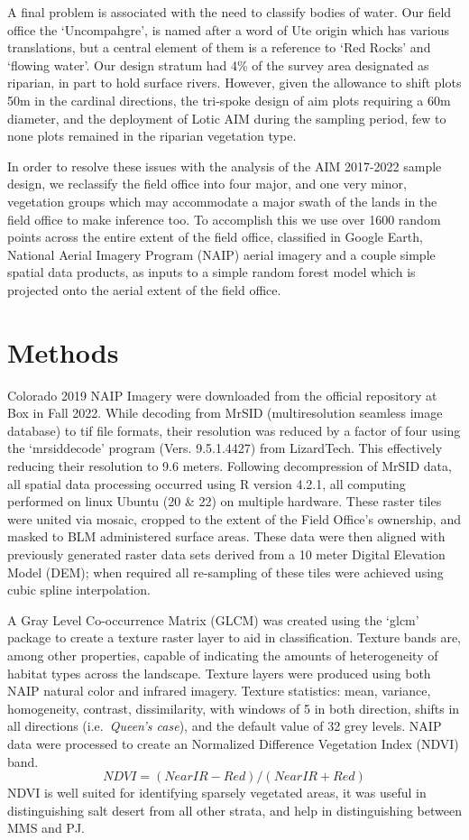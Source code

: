 \documentclass[
]{article}
\begin{document}
A final problem is associated with the need to classify bodies of water.
Our field office the `Uncompahgre', is named after a word of Ute origin
which has various translations, but a central element of them is a
reference to `Red Rocks' and `flowing water'. Our design stratum had 4\%
of the survey area designated as riparian, in part to hold surface
rivers. However, given the allowance to shift plots 50m in the cardinal
directions, the tri-spoke design of aim plots requiring a 60m diameter,
and the deployment of Lotic AIM during the sampling period, few to none
plots remained in the riparian vegetation type.

In order to resolve these issues with the analysis of the AIM 2017-2022
sample design, we reclassify the field office into four major, and one
very minor, vegetation groups which may accommodate a major swath of the
lands in the field office to make inference too. To accomplish this we
use over 1600 random points across the entire extent of the field
office, classified in Google Earth, National Aerial Imagery Program
(NAIP) aerial imagery and a couple simple spatial data products, as
inputs to a simple random forest model which is projected onto the
aerial extent of the field office.

\hypertarget{methods}{%
\section{Methods}\label{methods}}

Colorado 2019 NAIP Imagery were downloaded from the official repository
at Box in Fall 2022. While decoding from MrSID (multiresolution seamless
image database) to tif file formats, their resolution was reduced by a
factor of four using the `mrsiddecode' program (Vers. 9.5.1.4427) from
LizardTech. This effectively reducing their resolution to 9.6 meters.
Following decompression of MrSID data, all spatial data processing
occurred using R version 4.2.1, all computing performed on linux Ubuntu
(20 \& 22) on multiple hardware. These raster tiles were united via
mosaic, cropped to the extent of the Field Office's ownership, and
masked to BLM administered surface areas. These data were then aligned
with previously generated raster data sets derived from a 10 meter
Digital Elevation Model (DEM); when required all re-sampling of these
tiles were achieved using cubic spline interpolation.

A Gray Level Co-occurrence Matrix (GLCM) was created using the `glcm'
package to create a texture raster layer to aid in classification.
Texture bands are, among other properties, capable of indicating the
amounts of heterogeneity of habitat types across the landscape. Texture
layers were produced using both NAIP natural color and infrared imagery.
Texture statistics: mean, variance, homogeneity, contrast,
dissimilarity, with windows of 5 in both direction, shifts in all
directions (i.e.~\emph{Queen's case}), and the default value of 32 grey
levels. NAIP data were processed to create an Normalized Difference
Vegetation Index (NDVI) band.
\[ NDVI = (NearIR - Red) / (NearIR + Red) \] NDVI is well suited for
identifying sparsely vegetated areas, it was useful in distinguishing
salt desert from all other strata, and help in distinguishing between
MMS and PJ.
\end{document}
